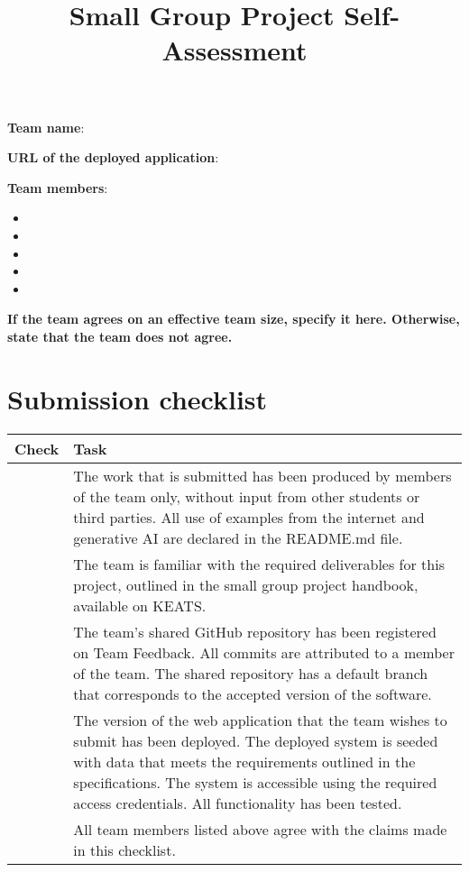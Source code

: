 \documentclass[11pt,a4paper]{article}
\begin{document}
\title{Small Group Project Self-Assessment}
\author{}
\date{}
\maketitle


\noindent\textbf{Team name}: %

\noindent\textbf{URL of the deployed application}: %

\noindent\textbf{Team members}:
\begin{itemize}
\setlength\itemsep{0em}
\item %
\item %
\item %
\item %
\item %
\end{itemize}

\noindent\textbf{If the team agrees on an effective team size, specify it here.  Otherwise, state that the team does not agree.} 

\section*{Submission checklist}
\begin{tabular}{|p{15mm}|p{13cm}|}
\hline
Check & Task \\
\hline
& The work that is submitted has been produced by members of the team only, without input from other students or third parties.  All use of examples from the internet and generative AI are declared in the README.md file.\\
\hline
& The team is familiar with the required deliverables for this project, outlined in the small group project handbook, available on KEATS.\\
\hline
& The team's shared GitHub repository has been registered on Team Feedback.  All commits are attributed to a member of the team.  The shared repository has a default branch that corresponds to the accepted version of the software.\\
\hline
& The version of the web application that the team wishes to submit has been deployed.  The deployed system is seeded with data that meets the requirements outlined in the specifications.  The system is accessible using the required access credentials.  All functionality has been tested.\\
\hline
& All team members listed above agree with the claims made in this checklist.\\
\hline
\end{tabular}
\end{document}

